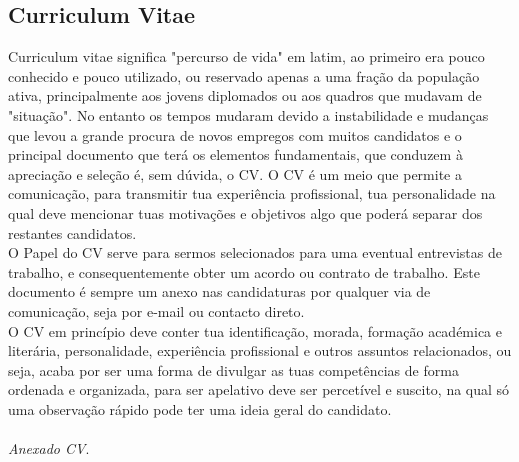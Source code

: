 \subsection{Curriculum Vitae}
\qquad Curriculum vitae significa "percurso de vida" \; em latim, ao primeiro era pouco conhecido e pouco utilizado, ou reservado apenas a uma fração da população ativa, principalmente aos jovens diplomados ou aos quadros que mudavam de "situação". No entanto os tempos mudaram devido a instabilidade e mudanças que levou a grande procura de novos empregos com muitos candidatos e o principal documento que terá os elementos fundamentais, que conduzem à apreciação e seleção é, sem dúvida, o CV.\cite{book_12}
O CV é um meio que permite a comunicação, para transmitir tua experiência profissional, tua personalidade na qual deve mencionar tuas motivações e objetivos algo que poderá separar dos restantes candidatos. \\
O Papel do CV serve para sermos selecionados para uma eventual entrevistas de trabalho, e consequentemente obter um acordo ou contrato de trabalho. Este documento é sempre um anexo nas candidaturas por qualquer via de comunicação, seja por e-mail ou contacto direto. \\
O CV em princípio deve conter tua identificação, morada, formação académica e literária, personalidade, experiência profissional e outros assuntos relacionados, ou seja, acaba por ser uma forma de divulgar as tuas competências de forma ordenada e organizada, para ser apelativo deve ser percetível e suscito, na qual só uma observação rápido pode ter uma ideia geral do candidato. \\
\\
\textit{Anexado CV}. \\
